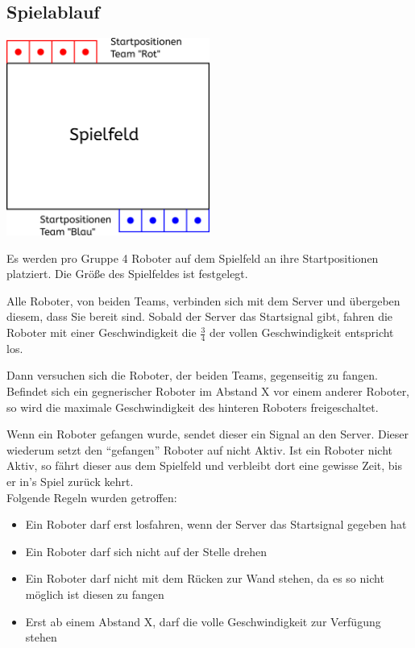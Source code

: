 \subsection{Spielablauf}
\begin{center}
	\includegraphics[width=0.5\textwidth]{Bilder/Spielfeld.pdf}
\end{center}
Es werden pro Gruppe 4 Roboter auf dem Spielfeld an ihre Startpositionen platziert.
Die Größe des Spielfeldes ist festgelegt.

Alle Roboter, von beiden Teams, verbinden sich mit dem Server und übergeben diesem, dass Sie bereit sind.
Sobald der Server das Startsignal gibt, fahren die Roboter mit einer Geschwindigkeit die $\frac{3}{4}$ der
vollen Geschwindigkeit entspricht los.

Dann versuchen sich die Roboter, der beiden Teams, gegenseitig zu fangen.
Befindet sich ein gegnerischer Roboter im Abstand X vor einem anderer Roboter, so wird die maximale Geschwindigkeit des hinteren Roboters freigeschaltet.

Wenn ein Roboter gefangen wurde, sendet dieser ein Signal an den Server. Dieser wiederum setzt den "`gefangen"' Roboter auf nicht Aktiv.
Ist ein Roboter nicht Aktiv, so fährt dieser aus dem Spielfeld und verbleibt dort eine gewisse Zeit, bis er in's Spiel zurück kehrt.\\
\newline
Folgende Regeln wurden getroffen:
\begin{itemize}
	\item Ein Roboter darf erst losfahren, wenn der Server das Startsignal gegeben hat
	\item Ein Roboter darf sich nicht auf der Stelle drehen
	\item Ein Roboter darf nicht mit dem Rücken zur Wand stehen, da es so nicht möglich ist diesen zu fangen 
	\item Erst ab einem Abstand X, darf die volle Geschwindigkeit zur Verfügung stehen
\end{itemize}